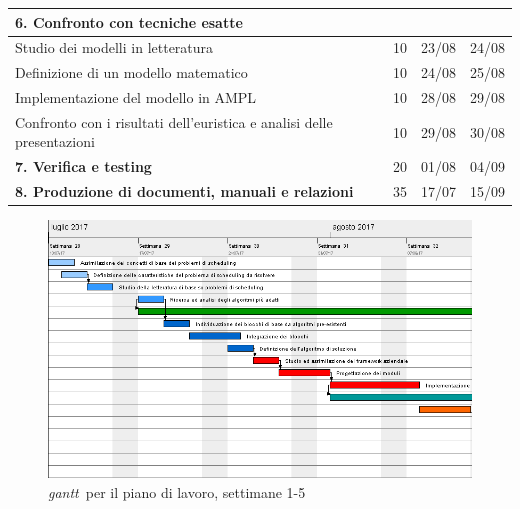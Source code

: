 \begin{table}[!htb]
\begin{tabularx}{\textwidth}{|X|c|c|c|}
        \hline \hline
        \multicolumn{4}{|l|}{\textbf{6. Confronto con tecniche esatte}}\\
        \hline
        Studio dei modelli in letteratura & 10 & 23/08 & 24/08\\
        \hline
        Definizione di un modello matematico & 10 & 24/08 & 25/08\\
        \hline
        Implementazione del modello in AMPL & 10 & 28/08 & 29/08\\
        \hline
        Confronto con i risultati dell'euristica e analisi delle presentazioni & 10 & 29/08 & 30/08\\
        
        \hline \hline
        \textbf{7. Verifica e testing} & 20 & 01/08 & 04/09\\
        
        \hline \hline
        \textbf{8. Produzione di documenti, manuali e relazioni} & 35 & 17/07 & 15/09\\
        \hline
        
    \end{tabularx}
\end{table}%
\clearpage
\begin{figure}[!h]
    \begin{widepage}
    \includegraphics[width=14.9cm,keepaspectratio]{../immagini/pdp_1.png}
    \caption{\emph{\gls{gantt}}\glsfirstoccur\ per il piano di lavoro, settimane 1-5}
    \end{widepage}
\end{figure}
